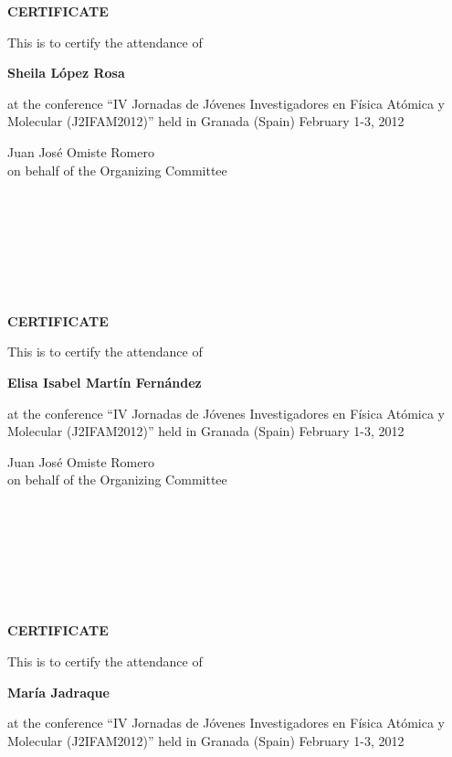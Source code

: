 \documentclass [13pt,a4paper] {letter}
\begin{document}
\pagestyle{empty}
\begin{center}
{\bf {\Huge CERTIFICATE}}

\vspace {1.5cm}
This is to certify the attendance of
\vspace {1cm}

{\bf \Large  Sheila    López Rosa  }
\vspace {1cm}

at the conference { \textquotedblleft IV Jornadas de Jóvenes Investigadores en Física Atómica y Molecular (J2IFAM2012)\textquotedblright} 
held in Granada (Spain) February 1-3, 2012
\end{center}
\vspace {4cm}
\begin{raggedleft}
Juan José Omiste Romero\\
on behalf of the Organizing Committee
\newpage
\end{raggedleft}
\begin{verbatim}







\end{verbatim}
\pagestyle{empty}
\begin{center}
{\bf {\Huge CERTIFICATE}}

\vspace {1.5cm}
This is to certify the attendance of
\vspace {1cm}

{\bf \Large  Elisa  Isabel  Martín Fernández }
\vspace {1cm}

at the conference { \textquotedblleft IV Jornadas de Jóvenes Investigadores en Física Atómica y Molecular (J2IFAM2012)\textquotedblright} 
held in Granada (Spain) February 1-3, 2012
\end{center}
\vspace {4cm}
\begin{raggedleft}
Juan José Omiste Romero\\
on behalf of the Organizing Committee
\newpage
\end{raggedleft}
\begin{verbatim}







\end{verbatim}
\pagestyle{empty}
\begin{center}
{\bf {\Huge CERTIFICATE}}

\vspace {1.5cm}
This is to certify the attendance of
\vspace {1cm}

{\bf \Large  María    Jadraque }
\vspace {1cm}

at the conference { \textquotedblleft IV Jornadas de Jóvenes Investigadores en Física Atómica y Molecular (J2IFAM2012)\textquotedblright} 
held in Granada (Spain) February 1-3, 2012
\end{center}
\end{document}
